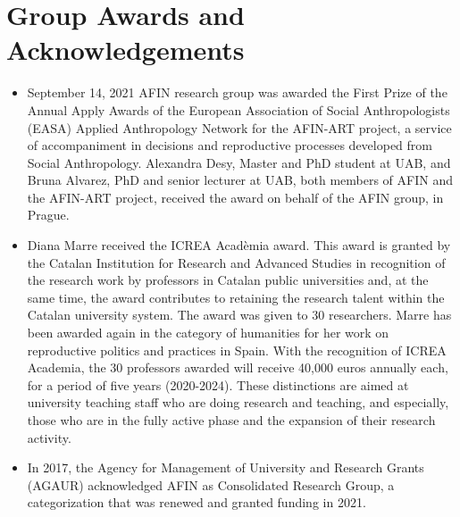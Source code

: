 \documentclass[english,a4paper,12pt,titlepage]{report}
\begin{document}
	\chapter{Group Awards and Acknowledgements}
	\begin{itemize}
		\item September 14, 2021 AFIN research group was awarded the First Prize of the Annual Apply Awards of the European Association of Social Anthropologists (EASA) Applied Anthropology Network for the AFIN-ART project, a service of accompaniment in decisions and reproductive processes developed from Social Anthropology. Alexandra Desy, Master and PhD student at UAB, and Bruna Alvarez, PhD and senior lecturer at UAB, both members of AFIN and the AFIN-ART project, received the award on behalf of the AFIN group, in Prague.
		\item Diana Marre received the ICREA Acadèmia award. This award is granted by the Catalan Institution for Research and Advanced Studies in recognition of the research work by professors in Catalan public universities and, at the same time, the award contributes to retaining the research talent within the Catalan university system. The award was given to 30 researchers. Marre has been awarded again in the category of humanities for her work on reproductive politics and practices in Spain. With the recognition of ICREA Academia, the 30 professors awarded will receive 40,000 euros annually each, for a period of five years (2020-2024). These distinctions are aimed at university teaching staff who are doing research and teaching, and especially, those who are in the fully active phase and the expansion of their research activity.
		\item In 2017, the Agency for Management of University and Research Grants (AGAUR) acknowledged AFIN as Consolidated Research Group, a categorization that was renewed and granted funding in 2021.
	\end{itemize}

\end{document}
